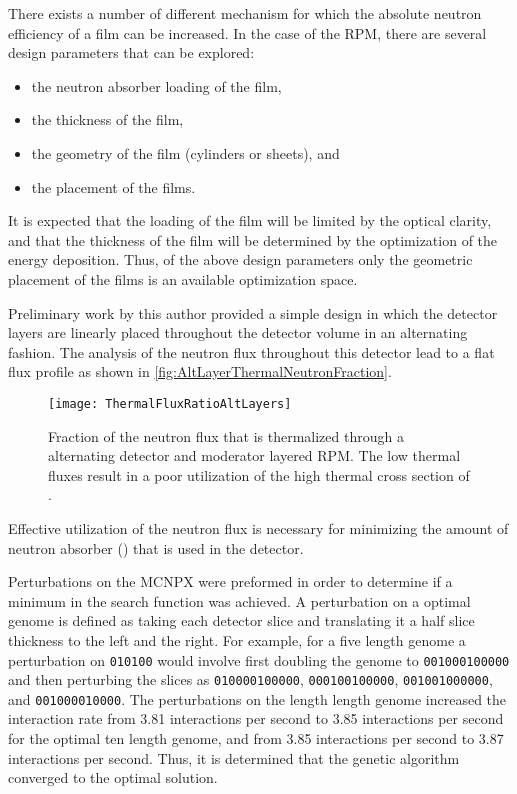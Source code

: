 There exists a number of different mechanism for which the absolute neutron efficiency of a film can be increased.
In the case of the RPM, there are several design parameters that can be explored:
\begin{itemize}
  \item the neutron absorber loading of the film,
  \item the thickness of the film,
  \item the geometry of the film (cylinders or sheets), and
  \item the placement of the films.
\end{itemize}
It is expected that the loading of the film will be limited by the optical clarity, and that the thickness of the film will be determined by the optimization of the energy deposition.
Thus, of the above design parameters only the geometric placement of the films is an available optimization space.

Preliminary work by this author provided a simple design in which the detector layers are linearly placed throughout the detector volume in an alternating fashion.
The analysis of the neutron flux throughout this detector lead to a flat flux profile as shown in \autoref{fig:AltLayerThermalNeutronFraction}.
\begin{figure}
  \texttt{[image: ThermalFluxRatioAltLayers]}
	\caption{Fraction of the neutron flux that is thermalized through a alternating detector and moderator layered RPM.  The low thermal fluxes result in a poor utilization of the high thermal cross section of .}
	\label{fig:AltLayerThermalNeutronFraction}
\end{figure}
Effective utilization of the neutron flux is necessary for minimizing the amount of neutron absorber () that is used in the detector.

Perturbations on the MCNPX were preformed in order to determine if a minimum in the search function was achieved.
A perturbation on a optimal genome is defined as taking each detector slice and translating it a half slice thickness to the left and the right. 
For example, for a five length genome a perturbation on \verb+010100+ would involve first doubling the genome to  \verb+001000100000+ and then perturbing the slices as  \verb+010000100000+, \verb+000100100000+, \verb+001001000000+, and \verb+001000010000+.
The perturbations on the length length genome increased the interaction rate from 3.81 interactions per second to 3.85 interactions per second for the optimal ten length genome, and from 3.85 interactions per second to 3.87 interactions per second.
Thus, it is determined that the genetic algorithm converged to the optimal solution.

